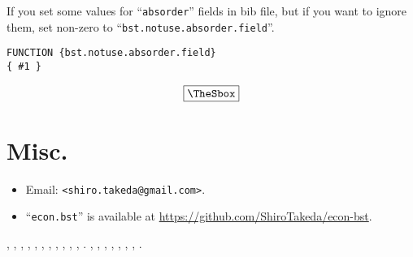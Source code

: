 \documentclass[10pt]{article}
\newenvironment{Frame}%
{\setlength{\fboxsep}{15pt}
\setlength{\mylength}{\linewidth}%
\addtolength{\mylength}{-2\fboxsep}%
\addtolength{\mylength}{-2\fboxrule}%
\Sbox
\minipage{\mylength}%
\setlength{\abovedisplayskip}{0pt}%
\setlength{\belowdisplayskip}{0pt}%
}%
{\endminipage\endSbox
\[\fbox{\TheSbox}\]}
\begin{document}
If you set some values for ``\texttt{absorder}'' fields in bib file,
but if you want to ignore them, set non-zero to
``\texttt{bst.notuse.absorder.field}''.
\begin{Frame}
\begin{verbatim}
FUNCTION {bst.notuse.absorder.field}
{ #1 }
\end{verbatim}
\end{Frame}

\section{Misc.}

\begin{itemize}
 \item Email: \verb|<shiro.takeda@gmail.com>|.
 \item ``\texttt{econ.bst}'' is available at \url{https://github.com/ShiroTakeda/econ-bst}.
\end{itemize}
\vspace*{1em}

\citet{borgers95:_note_implem_stron_domin},
\citet{bergemann11:_ration},
\citet{takeda2015a},
\citet{Takeda2014a},
\citet{Biker-2007-unemployment},
\citet{Babiker-1999-JapaneseNuclearPower},
\citet{Babiker-1999-KyotoProtocoland},
\citet{Babiker2000525},
\citet{BabikerRutherford-2005-EconomicEffectsof},
\citet{goldin:katz:2011}, \citet{goldin:katz:2008}, \citet{goldin:katz:2000}.
\citet{stakeda2019web},
\citet{essd-10-405-2018},
\citet{luthi08:_high},
\citet{doi:10.1175/2009BAMS2778.1},
\citet{Rivers-2005-CombiningTop-Downand},
\citet{WilsonMannOtsuki-2005-AssessingBenefitsof},
\citet{zhang2016Deep},
\citet{imbens2019Optimized}.

\vspace*{1em}

\nocite{*}




\end{document}
